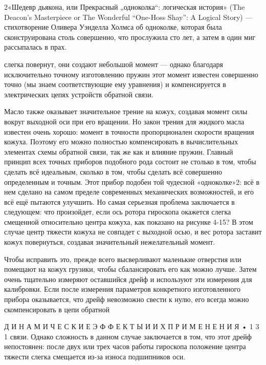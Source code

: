 \documentclass[10pt,oneside]{article}
\begin{document}
2«Шедевр дьякона, или Прекрасный „одноколка“: логическая история» (The Deacon’s Masterpiece or The Wonderful “One-Hoss Shay”: A Logical Story) --- стихотворение Оливера Уэнделла Холмса об одноколке, которая была сконструирована столь совершенно, что прослужила сто лет, а затем в один миг рассыпалась в прах.\par

слегка повернут, они создают небольшой момент --- однако благодаря исключительно точному изготовлению пружин этот момент известен совершенно точно (мы знаем соответствующие ему уравнения) и компенсируется в электрических цепях устройств обратной связи.\par

Масло также оказывает значительное трение на кожух, создавая момент силы вокруг выходной оси при его вращении. Но закон трения для жидкого масла известен очень хорошо: момент в точности пропорционален скорости вращения кожуха. Поэтому его можно полностью компенсировать в вычислительных элементах схемы обратной связи, так же как и влияние пружин. Главный принцип всех точных приборов подобного рода состоит не столько в том, чтобы сделать всё идеальным, сколько в том, чтобы сделать всё совершенно определенным и точным. Этот прибор подобен той чудесной «одноколке»2: всё в нем сделано на самом пределе современных механических возможностей, и его всё ещё пытаются улучшить. Но самая серьезная проблема заключается в следующем: что произойдет, если ось ротора гироскопа окажется слегка смещенной относительно центра кожуха, как показано на рисунке 4-15? В этом случае центр тяжести кожуха не совпадет с выходной осью, и вес ротора заставит кожух повернуться, создавая значительный нежелательный момент.\par

Чтобы исправить это, прежде всего высверливают маленькие отверстия или помещают на кожух грузики, чтобы сбалансировать его как можно лучше. Затем очень тщательно измеряют оставшийся дрейф и используют эти измерения для калибровки. Если после измерения параметров конкретного изготовленного прибора оказывается, что дрейф невозможно свести к нулю, его всегда можно скомпенсировать в цепи обратной\par

Д И Н А М И Ч Е С К И Е  Э Ф Ф Е К Т Ы  И  И Х  П Р И М Е Н Е Н И Я • 1 3 1 связи. Однако сложность в данном случае заключается в том, что этот дрейф непостоянен: после двух или трех часов работы гироскопа положение центра тяжести слегка смещается из-за износа подшипников оси.\par
\end{document}
